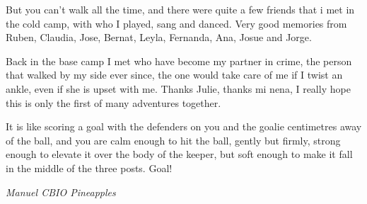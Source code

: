 But you can't walk all the time, and there were quite a few friends that i met in the cold camp, with who I played, sang and danced. Very good memories from Ruben, Claudia, Jose, Bernat, Leyla, Fernanda, Ana, Josue and Jorge.

Back in the base camp I met who have become my partner in crime, the person that walked by my side ever since, the one would take care of me if I twist an ankle, even if she is upset with me. Thanks Julie, thanks mi nena, I really hope this is only the first of many adventures together.

It is like scoring a goal with the defenders on you and the goalie centimetres away of the ball, and you are calm enough to hit the ball, gently but firmly, strong enough to elevate it over the body of the keeper, but soft enough to make it fall in the middle of the three posts. Goal!


\emph{ Manuel CBIO Pineapples }